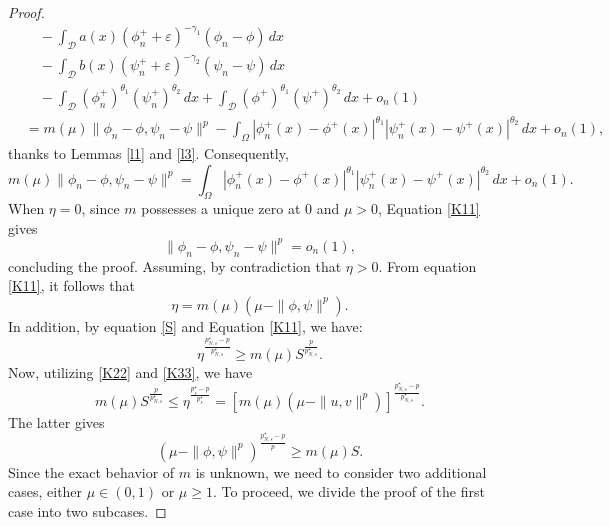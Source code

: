 \documentclass[reqno]{amsart}
\begin{document}
\begin{proof}
\begin{align*}
&\quad -\int_\mathcal{D}a(x)(\phi_n^++\varepsilon)^{-\gamma_1}(\phi_n-\phi)\,dx\\
&\quad -\int_\mathcal{D}b(x)(\psi_n^++\varepsilon)^{-\gamma_2}(\psi_n-\psi)\,dx\\
&\quad -\int_\mathcal{D}(\phi_n^+)^{\theta_1}(\psi_n^+)^{\theta_2}\,dx
 +\int_\mathcal{D}(\phi^+)^{\theta_1}(\psi^+)^{\theta_2}\,dx+ o_n(1)  \\
&=m(\mu)\| \phi_n-\phi,\psi_n-\psi\|^p
 -\int_\Omega |\phi^+_n(x)-\phi^+(x)|^{\theta_1}|\psi^+_n(x)
 -\psi^+(x)|^{\theta_2}\,dx+o_n(1),
\end{align*}
thanks to Lemmas \ref{l1} and \ref{l3}. Consequently,
\begin{equation}\label{K11}
m(\mu)\| \phi_n-\phi,\psi_n-\psi\|^p=\int_\Omega |\phi^+_n(x)
-\phi^+(x)|^{\theta_1}|\psi^+_n(x)-\psi^+(x)|^{\theta_2}\,dx+o_n(1).
\end{equation}
When $\eta=0$, since $m$ possesses a unique zero at $0$ and $\mu>0$, Equation \eqref{K11}
gives
$$
\|\phi_n-\phi,\psi_n-\psi\|^p=o_n(1),
$$
concluding the proof.  Assuming, by contradiction that $\eta>0$.
From equation \eqref{K11}, it follows that
\begin{equation}\label{K22}
\eta=m(\mu)\left(\mu-\|\phi,\psi\|^p\right).
\end{equation}
In addition, by equation \eqref{S} and Equation \eqref{K11}, we have:
\begin{equation}\label{K33}
\eta^\frac{p^\star_{N,s}-p}{p^\star_{N,s}}\geq m(\mu)S^\frac{p}{p^\star_{N,s}}.
\end{equation}
Now, utilizing  \eqref{K22} and \eqref{K33}, we have
\begin{equation}\label{K44}
m(\mu)S^\frac{p}{p^\star_{N,s}}\leq \eta^\frac{p^\star_s-p}{p^\star_s}=\left[m(\mu)\left(\mu-\| u,v\|^p\right)\right]^\frac{p^\star_{N,s}-p}{p^\star_{N,s}}.
\end{equation}
The latter gives
\begin{equation}\label{K54}
\left(\mu-\| \phi,\psi \|^p\right)^\frac{p^\star_{N,s}-p}{p}\geq m(\mu) S.
\end{equation}
Since the exact behavior of $m$ is unknown, we need to consider two additional cases,
either $\mu\in (0,1)$ or $\mu\geq 1$.  To proceed, we divide the proof of the first
 case into two subcases.
\smallskip


\end{proof}
\end{document}

